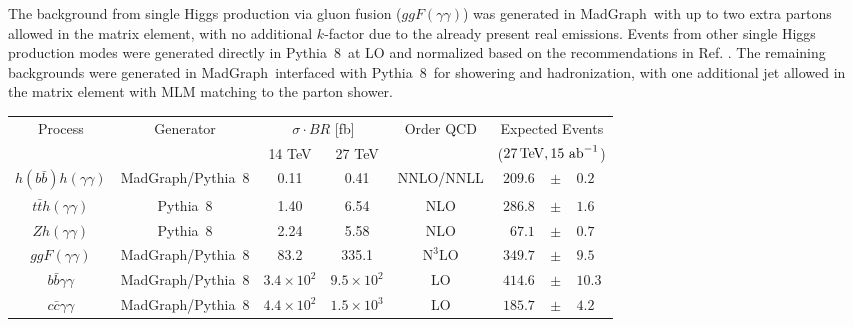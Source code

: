 The background from single Higgs production via gluon fusion ($ggF(\gamma\gamma)$) was generated in {\sc\small MadGraph}\ with up to two extra partons allowed in the matrix element, with no additional $k$-factor due to the already present real emissions. Events from other single Higgs production modes were generated directly in {\sc\small Pythia~8}\ at LO and normalized based on the recommendations in Ref. \cite{DeFlorian:2016spz}. The remaining backgrounds were generated in {\sc\small MadGraph}\ interfaced with {\sc\small Pythia~8}\ for showering and hadronization, with one additional jet allowed in the matrix element with MLM matching \cite{Mangano:2006rw, Alwall:2007fs} to the parton shower.

\begingroup
\renewcommand*{\arraystretch}{.7}
\begin{table}
\centering
\begin{tabular}{|c|c|cc|c|rcl|}
\hline
\multirow{2}{*}{Process}     & \multirow{2}{*}{Generator} & \multicolumn{2}{c|}{$\sigma \cdot BR$ {[}fb{]}} & \multirow{2}{*}{Order QCD} & \multicolumn{3}{c|}{Expected Events} \\
                              			&                   							& 14 TeV  			& 27 TeV  			&		& \multicolumn{3}{c|}{($27\, {\rm TeV}, 15~\text{ab}^{-1}$)} \\ \hline
$h(b\bar{b})h(\gamma\gamma)$  	& {\sc\small MadGraph}/{\sc\small Pythia~8} 	& 0.11      			& 0.41      			& NNLO/NNLL								& $209.6$		& $\pm$ & $0.2$ \\ \hline
$t\bar{t}h(\gamma\gamma)$     		& {\sc\small Pythia~8}           			& 1.40      			& 6.54      			& NLO  										& $286.8$		& $\pm$ & $1.6$\\
$Zh(\gamma\gamma)$            		& {\sc\small Pythia~8}           			& 2.24      			& 5.58      			& NLO 											& $67.1$ 		& $\pm$ & $0.7$ \\
$ggF(\gamma\gamma)$           		& {\sc\small MadGraph}/{\sc\small Pythia~8} 	& 83.2      			& 335.1     		& $\text{N}^{3}\text{LO}$ 				& $349.7$ 	& $\pm$ & $9.5$ \\ \hline
$b\bar{b}\gamma\gamma$        	& {\sc\small MadGraph}/{\sc\small Pythia~8} 	& $3.4\times 10^{2}$     & $9.5\times 10^{2}$     & LO 					& $414.6$ 	& $\pm$ & $10.3$ \\
$c\bar{c}\gamma\gamma$        		& {\sc\small MadGraph}/{\sc\small Pythia~8} 	& $4.4\times 10^{2}$     & $1.5\times 10^{3}$     & LO 					& $185.7$ 	& $\pm$ & $4.2$ \\

\end{tabular}
\end{table}
